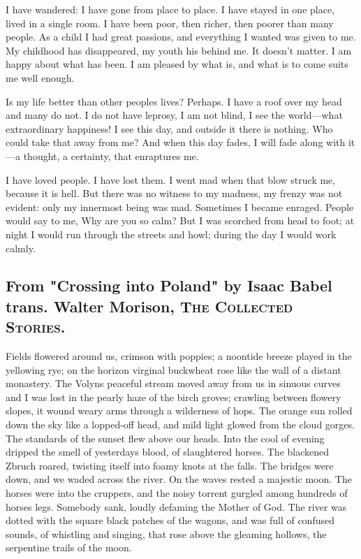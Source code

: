 \documentclass[
]{memoir}
\begin{document}
I have wandered: I have gone from place to place. I have stayed in one
place, lived in a single room. I have been poor, then richer, then
poorer than many people. As a child I had great passions, and everything
I wanted was given to me. My childhood has disappeared, my youth his
behind me. It doesn't matter. I am happy about what has been. I am
pleased by what is, and what is to come suits me well enough.

Is my life better than other peoples lives? Perhaps. I have a roof over
my head and many do not. I do not have leprosy, I am not blind, I see
the world---what extraordinary happiness! I see this day, and outside it
there is nothing. Who could take that away from me? And when this day
fades, I will fade along with it---a thought, a certainty, that
enraptures me.

I have loved people. I have lost them. I went mad when that blow struck
me, because it is hell. But there was no witness to my madness, my
frenzy was not evident: only my innermost being was mad. Sometimes I
became enraged. People would say to me, Why are you so calm? But I was
scorched from head to foot; at night I would run through the streets and
howl; during the day I would work calmly.

\hypertarget{from-crossing-into-poland-by-isaac-babel-trans.-walter-morison-the-collected-stories.}{%
\subsection*{\texorpdfstring{From "Crossing into Poland" by Isaac Babel
trans. Walter Morison, \textsc{The Collected
Stories}.}{From "Crossing into Poland" by Isaac Babel trans. Walter Morison, The Collected Stories.}}\label{from-crossing-into-poland-by-isaac-babel-trans.-walter-morison-the-collected-stories.}}

Fields flowered around us, crimson with poppies; a noontide breeze
played in the yellowing rye; on the horizon virginal buckwheat rose like
the wall of a distant monastery. The Volyns peaceful stream moved away
from us in sinuous curves and I was lost in the pearly haze of the birch
groves; crawling between flowery slopes, it wound weary arms through a
wilderness of hops. The orange sun rolled down the sky like a lopped-off
head, and mild light glowed from the cloud gorges. The standards of the
sunset flew above our heads. Into the cool of evening dripped the smell
of yesterdays blood, of slaughtered horses. The blackened Zbruch roared,
twisting itself into foamy knots at the falls. The bridges were down,
and we waded across the river. On the waves rested a majestic moon. The
horses were into the cruppers, and the noisy torrent gurgled among
hundreds of horses legs. Somebody sank, loudly defaming the Mother of
God. The river was dotted with the square black patches of the wagons,
and was full of confused sounds, of whistling and singing, that rose
above the gleaming hollows, the serpentine trails of the moon.
\end{document}
